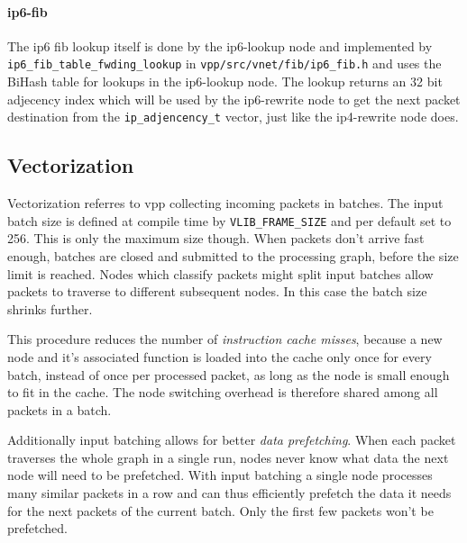 
\paragraph{ip6-fib}

The ip6 \Ac{fib} lookup itself is done by the ip6-lookup node and
implemented by \lstinline|ip6_fib_table_fwding_lookup| in
\lstinline|vpp/src/vnet/fib/ip6_fib.h| and uses the BiHash table for
lookups in the ip6-lookup node. The lookup returns an 32 bit adjecency
index which will be used by the ip6-rewrite node to get the next
packet destination from the \lstinline|ip_adjencency_t| vector, just
like the ip4-rewrite node does.



\subsection{Vectorization}


Vectorization referres to \Ac{vpp} collecting incoming packets in
batches. The input batch size is defined at compile time by
\lstinline|VLIB_FRAME_SIZE| and per default set to 256. This is only
the maximum size though. When packets don't arrive fast enough,
batches are closed and submitted to the processing graph, before the
size limit is reached. Nodes which classify packets might split input
batches allow packets to traverse to different subsequent nodes. In
this case the batch size shrinks further.

This procedure reduces the number of \textit{instruction cache misses}, because
a new node and it's associated function is loaded into the cache only
once for every batch, instead of once per processed packet, as long as
the node is small enough to fit in the cache. The node switching
overhead is therefore shared among all packets in a batch.

Additionally input batching allows for better \textit{data prefetching}. When
each packet traverses the whole graph in a single run, nodes never
know what data the next node will need to be prefetched. With input
batching a single node processes many similar packets in a row and can
thus efficiently prefetch the data it needs for the next packets of
the current batch. Only the first few packets won't be prefetched.

